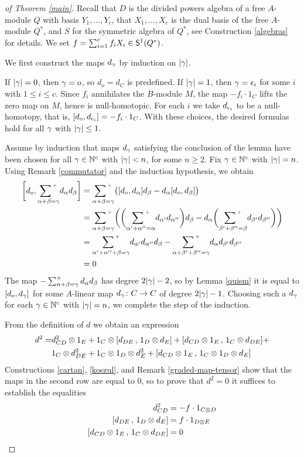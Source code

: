 \begin{proof}[of Theorem \ref{main}]
Recall that $D$ is the divided powers algebra of a free $A$-module $Q$
with basis $Y_1,\dots, Y_c$, that $X_1, \dots,X_c$ is the dual basis of
the free $A$-module $Q^*$, and $S$ for the symmetric algebra of $Q^*$,
see Construction \ref{algebras} for details.  We set $f=\sum_{i=1}^c
f_iX_i \in{\mathsf S}^{1}(Q^*)$.

We first construct the maps $d_\gamma$ by induction on $|\gamma|$.

If $|\gamma|=0$, then $\gamma=o$, so $d_o=d_C$ is predefined.  If $|\gamma|=1$,
then $\gamma=\epsilon_i$ for some $i$ with $1\le i\le c$.  Since $f_i$
annihilates the $B$-module $M$, the map $-f_i \cdot 1_C$ lifts the
zero map on $M$, hence is null-homotopic.  For each $i$ we take
$d_{\epsilon_i}$ to be a null-homotopy, that is, $[d_o,d_{\epsilon_i}]=-f_i
\cdot 1_C$.  With these choices, the desired formulas hold for all $\gamma$
with $|\gamma|\le1$.

Assume by induction that maps $d_\gamma$ satisfying the conclusion of the
lemma have been chosen for all $\gamma\in{\mathbb N}^c$ with $|\gamma|<n$, for some 
$n\ge2$.  Fix $\gamma\in{\mathbb N}^c$ with $|\gamma|=n$.  Using Remark \ref{commutator}
and the induction hypothesis, we obtain
\begin{align*}
\bigg[d_o,\ssum{\a+\b=\g} d_\a d_\b\bigg]
&=\ssum{\a+\b=\g}\big([d_o,d_\a] d_\b -d_\a [d_o,d_\b]\big)\\
&=\ssum{\a+\b=\g}\bigg(
\bigg(\ssum{\a'+\a''=\a} d_{\a'} d_{\a''}\bigg)d_\b
-d_\a\bigg(\ssum{\b'+\b''=\b} d_{\b'} d_{\b''}\bigg)\bigg)\\
&=\ssum{\a'+\a''+\b=\g}d_{\a'} d_{\a''} d_{\b}
-\ssum{\a+\b'+\b''=\g}d_{\a} d_{\b'} d_{\b''}\\
&=0
\end{align*}
The map $-\sum^+_{\alpha+\beta=\gamma} d_\alpha d_\beta$ has degree $2|\gamma|-2$, so by
Lemma \ref{quism} it is equal to $[d_o,d_\gamma]$ for some $A$-linear map
$d_\gamma\colon C\to C$ of degree $2|\gamma|-1$.  Choosing such a $d_\gamma$ for
each $\gamma\in{\mathbb N}^c$ with $|\gamma|=n$, we complete the step of the induction.

From the definition of $d$ we obtain an expression
\begin{align*}
d^2 =& d_{CD}^2\otimes 1_E +
1_C\otimes[d_{DE}\,,\,1_D\otimes d_E]+
[d_{CD}\otimes 1_E\,,\,1_C\otimes d_{DE}]+
\\
&1_C\otimes d_{DE}^2 +
1_C\otimes 1_D\otimes d_E^2 +
[d_{CD}\otimes 1_E\,,\,1_C\otimes 1_D\otimes d_E]
\end{align*}
Constructions \ref{cartan}, \ref{koszul}, and Remark
\ref{graded-map-tensor} show that the maps in the second row are equal
to $0$, so to prove that $d^2=0$ it suffices to establish the
equalities
\begin{align}
\label{first}
        d_{CD}^2 & = -f\cdot 1_{C\otimes D} \\
\label{second}
        [d_{DE}\,,\,1_D\otimes d_E] & = f\cdot 1_{D\otimes E}\\
\label{third}
        [d_{CD}\otimes 1_E\,,\,1_C\otimes d_{DE}] & =  0
\end{align}


\end{proof}
